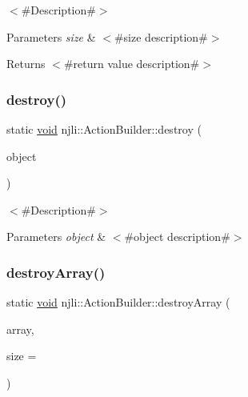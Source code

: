 $<$\#\+Description\#$>$


\begin{DoxyParams}{Parameters}
{\em size} & $<$\#size description\#$>$\\
\hline
\end{DoxyParams}
\begin{DoxyReturn}{Returns}
$<$\#return value description\#$>$ 
\end{DoxyReturn}
\mbox{\label{classnjli_1_1_action_builder_a41bc319da348dc6a8388bbec26cfd93e}} 
\subsubsection{\texorpdfstring{destroy()}{destroy()}}
{\footnotesize\ttfamily static \mbox{\hyperlink{_thread_8h_af1e856da2e658414cb2456cb6f7ebc66}{void}} njli\+::\+Action\+Builder\+::destroy (\begin{DoxyParamCaption}\item[{\mbox{\hyperlink{classnjli_1_1_action_builder}{Action\+Builder}} $\ast$}]{object }\end{DoxyParamCaption})\hspace{0.3cm}{\ttfamily [static]}}

$<$\#\+Description\#$>$


\begin{DoxyParams}{Parameters}
{\em object} & $<$\#object description\#$>$ \\
\hline
\end{DoxyParams}
\mbox{\label{classnjli_1_1_action_builder_aa1ef775a2c7fa6f4b82c205c2aa815db}} 
\subsubsection{\texorpdfstring{destroy\+Array()}{destroyArray()}}
{\footnotesize\ttfamily static \mbox{\hyperlink{_thread_8h_af1e856da2e658414cb2456cb6f7ebc66}{void}} njli\+::\+Action\+Builder\+::destroy\+Array (\begin{DoxyParamCaption}\item[{\mbox{\hyperlink{classnjli_1_1_action_builder}{Action\+Builder}} $\ast$$\ast$}]{array,  }\item[{const \mbox{\hyperlink{_util_8h_a10e94b422ef0c20dcdec20d31a1f5049}{u32}}}]{size = {} }\end{DoxyParamCaption})\hspace{0.3cm}{\ttfamily [static]}}

